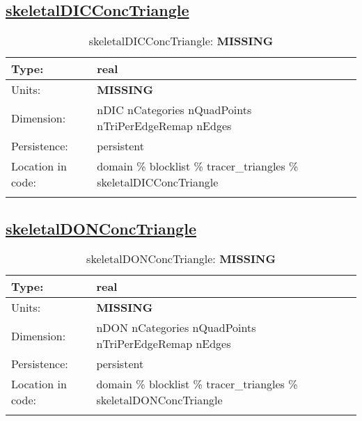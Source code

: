 \subsection[skeletalDICConcTriangle]{\hyperref[sec:var_tab_tracer_triangles]{skeletalDICConcTriangle}}
\label{subsec:var_sec_tracer_triangles_skeletalDICConcTriangle}
\begin{center}
\begin{longtable}{| p{2.0in} | p{4.0in} |}
        \hline 
        Type: & real \\
        \hline 
        Units: & {\bf \color{red} MISSING} \\
        \hline 
        Dimension: & nDIC nCategories nQuadPoints nTriPerEdgeRemap nEdges \\
        \hline 
        Persistence: & persistent \\
        \hline 
         Location in code: & domain \% blocklist \% tracer\_triangles \% skeletalDICConcTriangle \\
         \hline 
    \caption{skeletalDICConcTriangle: {\bf \color{red} MISSING}}
\end{longtable}
\end{center}
\subsection[skeletalDONConcTriangle]{\hyperref[sec:var_tab_tracer_triangles]{skeletalDONConcTriangle}}
\label{subsec:var_sec_tracer_triangles_skeletalDONConcTriangle}
\begin{center}
\begin{longtable}{| p{2.0in} | p{4.0in} |}
        \hline 
        Type: & real \\
        \hline 
        Units: & {\bf \color{red} MISSING} \\
        \hline 
        Dimension: & nDON nCategories nQuadPoints nTriPerEdgeRemap nEdges \\
        \hline 
        Persistence: & persistent \\
        \hline 
         Location in code: & domain \% blocklist \% tracer\_triangles \% skeletalDONConcTriangle \\
         \hline 
    \caption{skeletalDONConcTriangle: {\bf \color{red} MISSING}}
\end{longtable}
\end{center}
